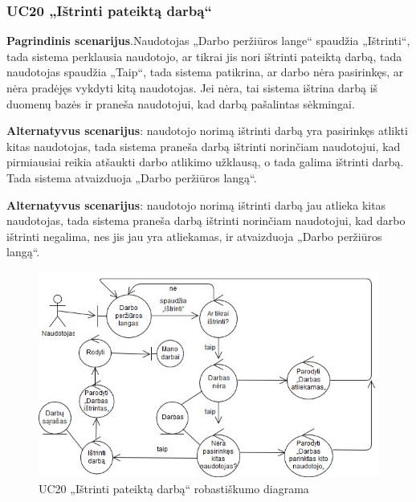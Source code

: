 \documentclass{VUMIFPSbakalaurinis}
\begin{document}
\subsubsection{UC20 „Ištrinti pateiktą darbą“}
\textbf{Pagrindinis scenarijus}.Naudotojas „Darbo peržiūros lange“ spaudžia „Ištrinti“, tada sistema perklausia naudotojo, ar tikrai jis nori ištrinti pateiktą darbą, tada naudotojas spaudžia „Taip“, tada sistema patikrina, ar darbo nėra pasirinkęs, ar nėra pradėjęs vykdyti kitą naudotojas. Jei nėra, tai sistema ištrina darbą iš duomenų bazės ir praneša naudotojui, kad darbą pašalintas sėkmingai.
\par \textbf{Alternatyvus scenarijus}: naudotojo norimą ištrinti darbą yra pasirinkęs atlikti kitas naudotojas, tada sistema praneša darbą ištrinti norinčiam naudotojui, kad pirmiausiai reikia atšaukti darbo atlikimo užklausą, o tada galima ištrinti darbą. Tada sistema atvaizduoja „Darbo peržiūros langą“.\\ 
\par \textbf{Alternatyvus scenarijus}: naudotojo norimą ištrinti darbą jau atlieka kitas naudotojas, tada sistema praneša darbą ištrinti norinčiam naudotojui, kad darbo ištrinti negalima, nes jis jau yra atliekamas, ir atvaizduoja „Darbo peržiūros langą“.

\begin{figure}[H]
	\centering
	\includegraphics[scale=0.6]{img/Robustness/UC20}
	\caption{UC20 „Ištrinti pateiktą darbą“ robastiškumo diagrama}
	\label{img:uc20rob}
\end{figure}
\end{document}

